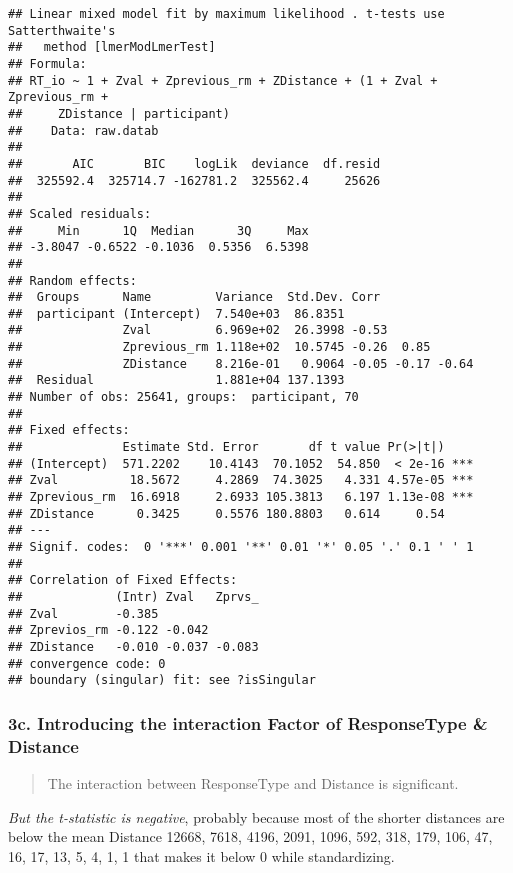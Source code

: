 \documentclass[
]{article}
\begin{document}
\begin{verbatim}
## Linear mixed model fit by maximum likelihood . t-tests use Satterthwaite's
##   method [lmerModLmerTest]
## Formula: 
## RT_io ~ 1 + Zval + Zprevious_rm + ZDistance + (1 + Zval + Zprevious_rm +  
##     ZDistance | participant)
##    Data: raw.datab
## 
##       AIC       BIC    logLik  deviance  df.resid 
##  325592.4  325714.7 -162781.2  325562.4     25626 
## 
## Scaled residuals: 
##     Min      1Q  Median      3Q     Max 
## -3.8047 -0.6522 -0.1036  0.5356  6.5398 
## 
## Random effects:
##  Groups      Name         Variance  Std.Dev. Corr             
##  participant (Intercept)  7.540e+03  86.8351                  
##              Zval         6.969e+02  26.3998 -0.53            
##              Zprevious_rm 1.118e+02  10.5745 -0.26  0.85      
##              ZDistance    8.216e-01   0.9064 -0.05 -0.17 -0.64
##  Residual                 1.881e+04 137.1393                  
## Number of obs: 25641, groups:  participant, 70
## 
## Fixed effects:
##              Estimate Std. Error       df t value Pr(>|t|)    
## (Intercept)  571.2202    10.4143  70.1052  54.850  < 2e-16 ***
## Zval          18.5672     4.2869  74.3025   4.331 4.57e-05 ***
## Zprevious_rm  16.6918     2.6933 105.3813   6.197 1.13e-08 ***
## ZDistance      0.3425     0.5576 180.8803   0.614     0.54    
## ---
## Signif. codes:  0 '***' 0.001 '**' 0.01 '*' 0.05 '.' 0.1 ' ' 1
## 
## Correlation of Fixed Effects:
##             (Intr) Zval   Zprvs_
## Zval        -0.385              
## Zprevios_rm -0.122 -0.042       
## ZDistance   -0.010 -0.037 -0.083
## convergence code: 0
## boundary (singular) fit: see ?isSingular
\end{verbatim}

\hypertarget{c.-introducing-the-interaction-factor-of-responsetype-distance}{%
\subsubsection{3c. Introducing the interaction Factor of ResponseType \&
Distance}\label{c.-introducing-the-interaction-factor-of-responsetype-distance}}

\begin{quote}
The interaction between ResponseType and Distance is significant.
\end{quote}

\emph{But the t-statistic is negative}, probably because most of the
shorter distances are below the mean Distance 12668, 7618, 4196, 2091,
1096, 592, 318, 179, 106, 47, 16, 17, 13, 5, 4, 1, 1 that makes it below
0 while standardizing.
\end{document}
